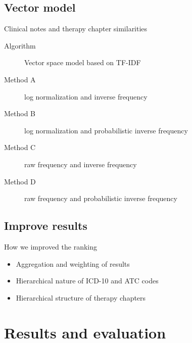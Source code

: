 \documentclass[screen, compress]{beamer}
\begin{document}
\subsection{Vector model}
\begin{frame}{Clinical notes and therapy chapter similarities} %
\Large
\begin{description}
	\item[Algorithm] Vector space model based on TF-IDF
	\item[Method A] log normalization and inverse frequency
	\item[Method B] log normalization and probabilistic inverse frequency
	\item[Method C] raw frequency and inverse frequency
	\item[Method D] raw frequency and probabilistic inverse frequency
\end{description}
\end{frame}

\subsection{Improve results}
\begin{frame}{How we improved the ranking} %
\Large
\begin{itemize}
	\item Aggregation and weighting of results
	\item Hierarchical nature of ICD-10 and ATC codes
	\item Hierarchical structure of therapy chapters
\end{itemize}
\end{frame}


\section{Results and evaluation}

\end{document}
